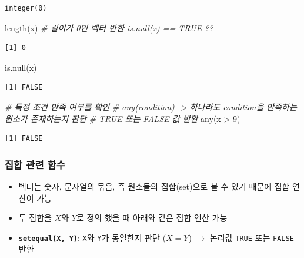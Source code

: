 \documentclass[
  11pt,
]{krantz}
\newenvironment{Shaded}{\begin{snugshade}}{\end{snugshade}}
\newcommand{\CommentTok}[1]{\textcolor[rgb]{0.37,0.37,0.37}{\textit{#1}}}
\newcommand{\DecValTok}[1]{\textcolor[rgb]{0.06,0.06,0.06}{#1}}
\newcommand{\FunctionTok}[1]{\textcolor[rgb]{0,0,0}{#1}}
\newcommand{\NormalTok}[1]{#1}
\newcommand{\SpecialCharTok}[1]{\textcolor[rgb]{0,0,0}{#1}}
\providecommand{\tightlist}{%
  \setlength{\itemsep}{0pt}\setlength{\parskip}{0pt}}
\begin{document}
\begin{verbatim}
integer(0)
\end{verbatim}

\begin{Shaded}
\begin{Highlighting}[]
\FunctionTok{length}\NormalTok{(x) }\CommentTok{\# 길이가 0인 벡터 반환 is.null(x) == TRUE ??}
\end{Highlighting}
\end{Shaded}

\begin{verbatim}
[1] 0
\end{verbatim}

\begin{Shaded}
\begin{Highlighting}[]
\FunctionTok{is.null}\NormalTok{(x)}
\end{Highlighting}
\end{Shaded}

\begin{verbatim}
[1] FALSE
\end{verbatim}

\begin{Shaded}
\begin{Highlighting}[]
\CommentTok{\# 특정 조건 만족 여부를 확인 }
\CommentTok{\# any(condition) {-}\textgreater{} 하나라도 condition을 만족하는 원소가 존재하는지 판단}
\CommentTok{\# TRUE 또는 FALSE 값 반환}
\FunctionTok{any}\NormalTok{(x }\SpecialCharTok{\textgreater{}} \DecValTok{9}\NormalTok{)}
\end{Highlighting}
\end{Shaded}

\begin{verbatim}
[1] FALSE
\end{verbatim}

\normalsize

\hypertarget{set-function}{%
\subsubsection*{\texorpdfstring{\textbf{집합 관련 함수}}{집합 관련 함수}}\label{set-function}}


\begin{itemize}
\tightlist
\item
  벡터는 숫자, 문자열의 묶음, 즉 원소들의 집합(set)으로 볼 수 있기 때문에 집합 연산이 가능
\item
  두 집합을 \(X\)와 \(Y\)로 정의 했을 때 아래와 같은 집합 연산 가능
\item
  \textbf{\texttt{setequal(X,\ Y)}}: \texttt{X}와 \texttt{Y}가 동일한지 판단 (\(X = Y\)) \(\rightarrow\) 논리값 \texttt{TRUE} 또는 \texttt{FALSE} 반환
\end{itemize}
\end{document}
